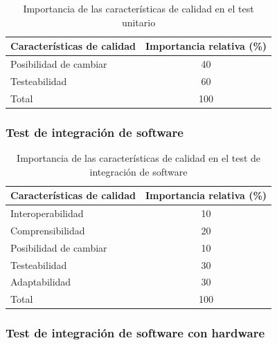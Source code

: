 \documentclass[
11pt, %
codirector, %
]{simple_charter}
\begin{document}
\begin{table}[H]
\centering
\begin{tabular}{@{}lc@{}}
\toprule
\textbf{Características de calidad} & \textbf{Importancia relativa (\%)} \\ \midrule
Posibilidad de cambiar              & 40                                 \\
Testeabilidad                       & 60                                 \\
Total                               & 100                                \\ \bottomrule
\end{tabular}
\caption{Importancia de las características de calidad en el test unitario}
\label{tab:ir-unit}
\end{table}

\subsubsection{Test de integración de software}
\label{sssec:test-de-integracion-de-software}

\begin{table}[H]
\centering
\begin{tabular}{@{}lc@{}}
\toprule
\textbf{Características de calidad} & \textbf{Importancia relativa (\%)} \\ \midrule
Interoperabilidad                   & 10                                 \\
Comprensibilidad                    & 20                                 \\
Posibilidad de cambiar              & 10                                 \\
Testeabilidad                       & 30                                 \\
Adaptabilidad                       & 30                                 \\
Total                               & 100                                \\ \bottomrule
\end{tabular}
\caption{Importancia de las características de calidad en el test de integración de software}
\label{tab:ir-int-soft}
\end{table}

\subsubsection{Test de integración de software con hardware}
\label{sssec:test-de-integracion-de-software-con-hardware}
\end{document}
